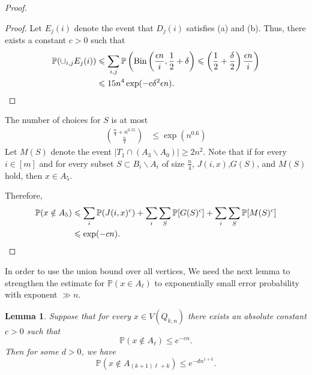 \documentclass[reqno,11pt]{amsart}
\newtheorem{lemma}[theorem]{Lemma}
\renewcommand{\leq}{\leqslant}
\renewcommand{\geq}{\geqslant}
\begin{document}
\begin{proof}
\begin{proof}
Let $E_j(i)$ denote the event that $D_j(i)$ satisfies (a) and (b). Thus, there exists a constant $c >0$ such that
\begin{align*}
   \mathbb{P}(\cup_{i,j}E_j(i)) & \leq \sum_{i,j}\mathbb{P}\left(\text{Bin}\left(\frac{\epsilon n}{i},\frac{1}{2}+\delta \right) \leq \left(\frac{1}{2}+\frac{\delta}{2} \right)\frac{\epsilon n}{i} \right) \\
   & \leq 15n^4 \exp(-c\delta^2 \epsilon n). \qedhere
\end{align*}

\end{proof}

The number of choices for $S$ is at most
\begin{align*}
    \binom{\frac{n}{4}+n^{0.55}}{\frac{n}{4}} &\leq \exp(n^{0.6})
\end{align*}
Let $M(S)$ denote the event $|T_1\cap (A_3 \backslash A_0)| \geq 2n^2$. Note that if for every $i \in [m]$ and for every subset $S \subset B_i \backslash A_i$ of size $\frac{n}{4}$, $J(i,x)$,$G(S)$, and $M(S)$ hold, then $x \in A_5$. 

Therefore,
\begin{align*}
   \mathbb{P}(x \notin A_5) &\leq \sum_{i}\mathbb{P}(J(i,x)^c) +\sum_{i}\sum_{S}\mathbb{P}[G(S)^c]+\sum_{i}\sum_{S}\mathbb{P}[M(S)^c]\\
   & \leq \exp(-cn). \qedhere
\end{align*}
\end{proof}
In order to use the union bound over all vertices, We need the next lemma to strengthen the estimate for $\mathbb{P}(x \in A_\ell)$ to exponentially small error probability with exponent $\gg n$. 

\begin{lemma} \label{lemma:e^(-n^{1+k})}
   Suppose that for every $x \in V(Q_{k,n})$ there exists an absolute constant $c >0$ such that 
$$\mathbb{P}(x \notin A_{\ell}) \leq e^{-cn}.$$
Then for some $d >0$, we have 
$$\mathbb{P}(x \notin A_{(k+1)\ell+k}) \leq e^{-dn^{1+k}}.$$ 
\end{lemma} 
\end{document}
